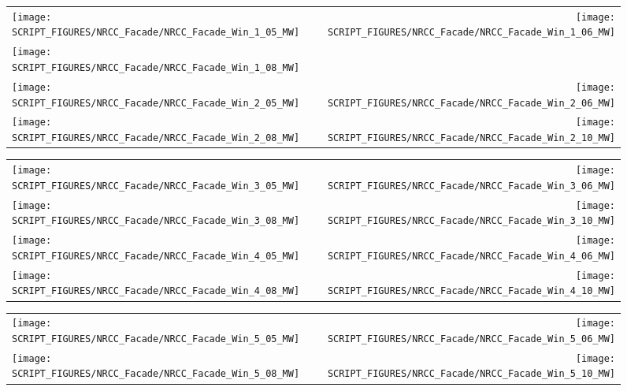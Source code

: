 \newpage

\begin{figure}[p]
\begin{tabular*}{\textwidth}{l@{\extracolsep{\fill}}r}
\texttt{[image: SCRIPT\_FIGURES/NRCC\_Facade/NRCC\_Facade\_Win\_1\_05\_MW]} &
\texttt{[image: SCRIPT\_FIGURES/NRCC\_Facade/NRCC\_Facade\_Win\_1\_06\_MW]} \\
\texttt{[image: SCRIPT\_FIGURES/NRCC\_Facade/NRCC\_Facade\_Win\_1\_08\_MW]} &
  \\
\texttt{[image: SCRIPT\_FIGURES/NRCC\_Facade/NRCC\_Facade\_Win\_2\_05\_MW]} &
\texttt{[image: SCRIPT\_FIGURES/NRCC\_Facade/NRCC\_Facade\_Win\_2\_06\_MW]} \\
\texttt{[image: SCRIPT\_FIGURES/NRCC\_Facade/NRCC\_Facade\_Win\_2\_08\_MW]} &
\texttt{[image: SCRIPT\_FIGURES/NRCC\_Facade/NRCC\_Facade\_Win\_2\_10\_MW]}
\end{tabular*}
\label{NRCC_Facade_1}
\end{figure}

\begin{figure}[p]
\begin{tabular*}{\textwidth}{l@{\extracolsep{\fill}}r}
\texttt{[image: SCRIPT\_FIGURES/NRCC\_Facade/NRCC\_Facade\_Win\_3\_05\_MW]} &
\texttt{[image: SCRIPT\_FIGURES/NRCC\_Facade/NRCC\_Facade\_Win\_3\_06\_MW]} \\
\texttt{[image: SCRIPT\_FIGURES/NRCC\_Facade/NRCC\_Facade\_Win\_3\_08\_MW]} &
\texttt{[image: SCRIPT\_FIGURES/NRCC\_Facade/NRCC\_Facade\_Win\_3\_10\_MW]} \\
\texttt{[image: SCRIPT\_FIGURES/NRCC\_Facade/NRCC\_Facade\_Win\_4\_05\_MW]} &
\texttt{[image: SCRIPT\_FIGURES/NRCC\_Facade/NRCC\_Facade\_Win\_4\_06\_MW]} \\
\texttt{[image: SCRIPT\_FIGURES/NRCC\_Facade/NRCC\_Facade\_Win\_4\_08\_MW]} &
\texttt{[image: SCRIPT\_FIGURES/NRCC\_Facade/NRCC\_Facade\_Win\_4\_10\_MW]}
\end{tabular*}
\label{NRCC_Facade_2}
\end{figure}

\begin{figure}[p]
\begin{tabular*}{\textwidth}{l@{\extracolsep{\fill}}r}
\texttt{[image: SCRIPT\_FIGURES/NRCC\_Facade/NRCC\_Facade\_Win\_5\_05\_MW]} &
\texttt{[image: SCRIPT\_FIGURES/NRCC\_Facade/NRCC\_Facade\_Win\_5\_06\_MW]} \\
\texttt{[image: SCRIPT\_FIGURES/NRCC\_Facade/NRCC\_Facade\_Win\_5\_08\_MW]} &
\texttt{[image: SCRIPT\_FIGURES/NRCC\_Facade/NRCC\_Facade\_Win\_5\_10\_MW]}
\end{tabular*}
\label{NRCC_Facade_3}
\end{figure}


